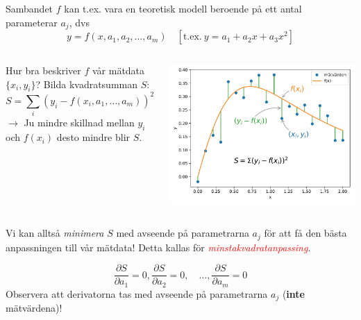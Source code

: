 \documentclass[9pt]{beamer}
\begin{document}
    \begin{frame}
        Sambandet $f$ kan t.ex. vara en teoretisk modell beroende på ett antal parameterar $a_j$, dvs
        \begin{equation*}
            y = f(x,a_1, a_2, \ldots, a_m) \quad \left[\text{t.ex.} \ y = a_1 + a_2x + a_3x^2 \right]
        \end{equation*}

        \vfill

        \begin{columns}
            Hur bra beskriver $f$ vår mätdata $\{x_i,y_i\}$? Bilda kvadratsumman $S$:
            \begin{equation*}
                S = \sum_i\left(y_i - f(x_i,a_1,\ldots,a_m)\right)^2
            \end{equation*}
            $\rightarrow$ Ju mindre skillnad mellan $y_i$ och $f(x_i)$ desto mindre blir $S$.

            \includegraphics[width=\textwidth]{S.pdf}
        \end{columns}

        \vfill
        Vi kan alltså \emph{minimera} $S$ med avseende på parametrarna $a_j$ för
        att få den bästa anpassningen till vår mätdata! Detta kallas för
        \textcolor{red}{\emph{minstakvadratanpassing}}.

        \begin{equation*}
            \frac{\partial S}{\partial a_1} = 0,
            \frac{\partial S}{\partial a_2} = 0,\quad\ldots,
            \frac{\partial S}{\partial a_m} = 0
        \end{equation*}
        Observera att derivatorna tas med avseende på parametrarna $a_j$ (\textbf{inte} mätvärdena)!
    \end{frame}
\end{document}
